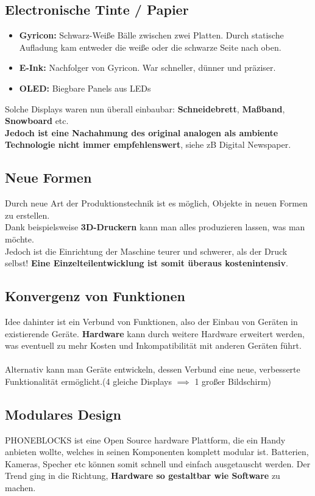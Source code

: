 \documentclass[a4paper]{article}
\begin{document}
\subsection{Electronische Tinte / Papier}
\begin{itemize}
	\item \textbf{Gyricon:} Schwarz-Weiße Bälle zwischen zwei Platten. Durch statische Aufladung kam entweder die weiße oder die schwarze Seite nach oben.
	\item \textbf{E-Ink:} Nachfolger von Gyricon. War schneller, dünner und präziser.
	\item \textbf{OLED:} Biegbare Panels aus LEDs
\end{itemize}
Solche Displays waren nun überall einbaubar: \textbf{Schneidebrett}, \textbf{Maßband}, \textbf{Snowboard} etc.\\
\textbf{ Jedoch ist eine Nachahmung des original analogen als ambiente Technologie nicht immer empfehlenswert}, siehe zB Digital Newspaper.

\subsection{Neue Formen}
Durch neue Art der Produktionstechnik ist es möglich, Objekte in neuen Formen zu erstellen.\\
Dank beispielsweise \textbf{3D-Druckern} kann man alles produzieren lassen, was man möchte.\\

Jedoch ist die Einrichtung der Maschine teurer und schwerer, als der Druck selbst! \textbf{Eine Einzelteilentwicklung ist somit überaus kostenintensiv}.

\subsection{Konvergenz von Funktionen}
Idee dahinter ist ein Verbund von Funktionen, also der Einbau von Geräten in existierende Geräte. \textbf{Hardware} kann durch weitere Hardware erweitert werden, was eventuell zu mehr Kosten und Inkompatibilität mit anderen Geräten führt.\\
\\
Alternativ kann man Geräte entwickeln, dessen Verbund eine neue, verbesserte Funktionalität ermöglicht.(4 gleiche Displays $\implies$ 1 großer Bildschirm)  

\subsection{Modulares Design}
PHONEBLOCKS ist eine Open Source hardware Plattform, die ein Handy anbieten wollte, welches in seinen Komponenten komplett modular ist. Batterien, Kameras, Specher etc können somit schnell und einfach ausgetauscht werden. Der Trend ging in die Richtung, \textbf{Hardware so gestaltbar wie Software} zu machen. \\
\end{document}
